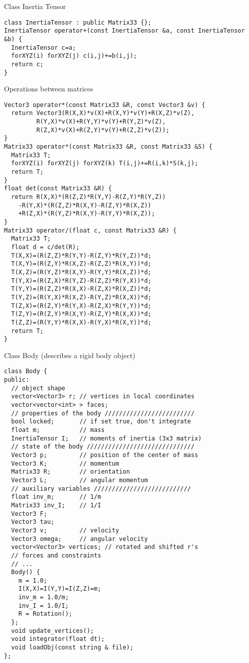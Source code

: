 Class Inertia Tensor
\begin{lstlisting}
class InertiaTensor : public Matrix33 {};
InertiaTensor operator+(const InertiaTensor &a, const InertiaTensor &b) {
  InertiaTensor c=a;
  forXYZ(i) forXYZ(j) c(i,j)+=b(i,j);
  return c;
}
\end{lstlisting}

Operations between matrices
\begin{lstlisting}
Vector3 operator*(const Matrix33 &R, const Vector3 &v) {
  return Vector3(R(X,X)*v(X)+R(X,Y)*v(Y)+R(X,Z)*v(Z),
		 R(Y,X)*v(X)+R(Y,Y)*v(Y)+R(Y,Z)*v(Z),
		 R(Z,X)*v(X)+R(Z,Y)*v(Y)+R(Z,Z)*v(Z));
}
Matrix33 operator*(const Matrix33 &R, const Matrix33 &S) {
  Matrix33 T;
  forXYZ(i) forXYZ(j) forXYZ(k) T(i,j)+=R(i,k)*S(k,j);
  return T;
}
float det(const Matrix33 &R) {
  return R(X,X)*(R(Z,Z)*R(Y,Y)-R(Z,Y)*R(Y,Z))
    -R(Y,X)*(R(Z,Z)*R(X,Y)-R(Z,Y)*R(X,Z))
    +R(Z,X)*(R(Y,Z)*R(X,Y)-R(Y,Y)*R(X,Z));
}
Matrix33 operator/(float c, const Matrix33 &R) {
  Matrix33 T;
  float d = c/det(R);
  T(X,X)=(R(Z,Z)*R(Y,Y)-R(Z,Y)*R(Y,Z))*d;
  T(X,Y)=(R(Z,Y)*R(X,Z)-R(Z,Z)*R(X,Y))*d;
  T(X,Z)=(R(Y,Z)*R(X,Y)-R(Y,Y)*R(X,Z))*d;
  T(Y,X)=(R(Z,X)*R(Y,Z)-R(Z,Z)*R(Y,X))*d;
  T(Y,Y)=(R(Z,Z)*R(X,X)-R(Z,X)*R(X,Z))*d;
  T(Y,Z)=(R(Y,X)*R(X,Z)-R(Y,Z)*R(X,X))*d;
  T(Z,X)=(R(Z,Y)*R(Y,X)-R(Z,X)*R(Y,Y))*d;
  T(Z,Y)=(R(Z,Y)*R(X,Y)-R(Z,Y)*R(X,X))*d;
  T(Z,Z)=(R(Y,Y)*R(X,X)-R(Y,X)*R(X,Y))*d;
  return T;
}
\end{lstlisting}

Class Body (describes a rigid body object)
\begin{lstlisting}
class Body {
public:
  // object shape
  vector<Vector3> r; // vertices in local coordinates
  vector<vector<int> > faces;
  // properties of the body /////////////////////////
  bool locked;       // if set true, don't integrate
  float m;           // mass
  InertiaTensor I;   // moments of inertia (3x3 matrix)
  // state of the body //////////////////////////////
  Vector3 p;         // position of the center of mass
  Vector3 K;         // momentum
  Matrix33 R;        // orientation
  Vector3 L;         // angular momentum
  // auxiliary variables ///////////////////////////
  float inv_m;       // 1/m
  Matrix33 inv_I;    // 1/I
  Vector3 F;
  Vector3 tau;
  Vector3 v;         // velocity
  Vector3 omega;     // angular velocity
  vector<Vector3> vertices; // rotated and shifted r's
  // forces and constraints
  // ...
  Body() {
    m = 1.0;
    I(X,X)=I(Y,Y)=I(Z,Z)=m;
    inv_m = 1.0/m;
    inv_I = 1.0/I;
    R = Rotation();
  };
  void update_vertices();
  void integrator(float dt);
  void loadObj(const string & file);
};
\end{lstlisting}

